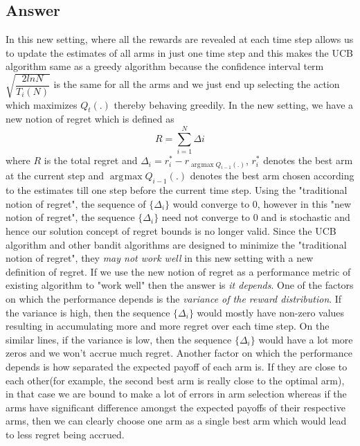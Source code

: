 \documentclass[english]{article}
\DeclareMathOperator*{\argmax}{\arg\!\max}
\begin{document}
\subsection{Answer}
In this new setting, where all the rewards are revealed at each time step allows us to update the estimates of all arms in just one time step and this makes the UCB algorithm same as a greedy algorithm because the confidence interval term $\sqrt{\dfrac{2lnN}{T_{i}(N)}}$ is the same for all the arms and we just end up selecting the action which maximizes $Q_{t}(.)$ thereby behaving greedily. In the new setting, we have a new notion of regret which is defined as 
$$ R = \sum_{i=1}^{N} \Delta{i} $$ where $R$ is the total regret and $\Delta_{i} = r_{i}^{*} - r_{\argmax Q_{i-1}(.)}$, $r_{i}^{*}$ denotes the best arm at the current step and $\argmax Q_{i-1}(.)$ denotes the best arm chosen according to the estimates till one step before the current time step.
\newline
\newline
Using the "traditional notion of regret", the sequence of $\{\Delta_{i}\}$ would converge to 0, however in this "new notion of regret", the sequence $\{\Delta_{i}\}$ need not converge to 0 and is stochastic and hence our solution concept of regret bounds is no longer valid. Since the UCB algorithm and other bandit algorithms are designed to minimize the "traditional notion of regret", they \emph{may not work well} in this new setting with a new definition of regret. If we use the new notion of regret as a performance metric of existing algorithm to "work well" then the answer is \emph{it depends}. 
\newline
\newline
One of the factors on which the performance depends is the \emph{variance of the reward distribution}. If the variance is high, then the sequence $\{\Delta_{i}\}$ would mostly have non-zero values resulting in accumulating more and more regret over each time step. On the similar lines, if the variance is low, then the sequence $\{\Delta_{i}\}$ would have a lot more zeros and we won't accrue much regret. 
\newline
Another factor on which the performance depends is how separated the expected payoff of each arm is. If they are close to each other(for example, the second best arm is really close to the optimal arm), in that case we are bound to make a lot of errors in arm selection whereas if the arms have significant difference amongst the expected payoffs of their respective arms, then we can clearly choose one arm as a single best arm which would lead to less regret being accrued.
\end{document}
